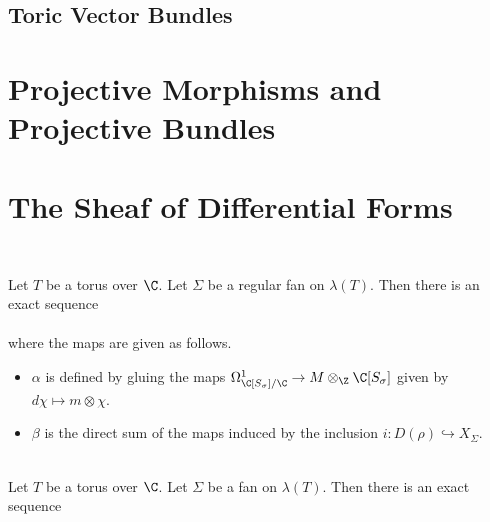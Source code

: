 \documentclass[a4paper]{article}
\begin{document}
\subsection{Toric Vector Bundles}

\pagebreak
\section{Projective Morphisms and Projective Bundles}

\pagebreak
\section{The Sheaf of Differential Forms}
\subsection{}
\begin{prp}{}{}\\
Let $T$ be a torus over $\C$. Let $\Sigma$ be a regular fan on $\lambda(T)$. Then there is an exact sequence \\
\\
where the maps are given as follows. 
\begin{itemize}
\item $\alpha$ is defined by gluing the maps $\Omega_{\C[S_\sigma]/\C}^1\to M\otimes_\Z\C[S_\sigma]$ given by $d\chi\mapsto m\otimes\chi$. 
\item $\beta$ is the direct sum of the maps induced by the inclusion $i:D(\rho)\hookrightarrow X_\Sigma$. 
\end{itemize}
\end{prp}

\begin{prp}{}{}\\
Let $T$ be a torus over $\C$. Let $\Sigma$ be a fan on $\lambda(T)$. Then there is an exact sequence \\
\\
\end{prp}
\end{document}
